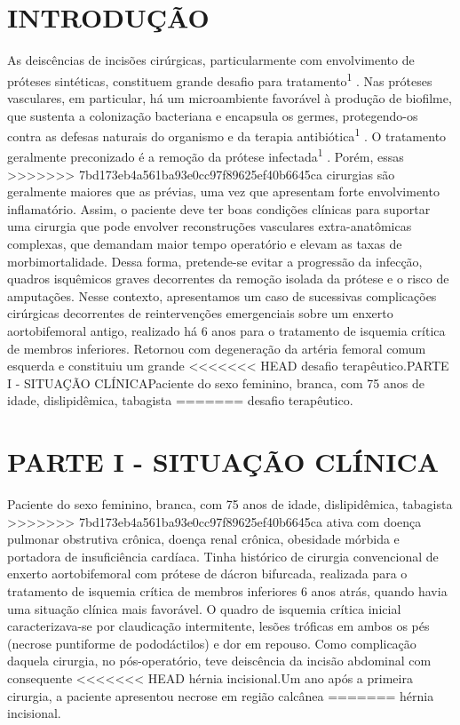 \documentclass[numberinsection,times,10pt,spreadimages]{memoir}
\begin{document}
\section{INTRODUÇÃO}

As deiscências de incisões cirúrgicas, particularmente com envolvimento de
próteses
sintéticas, constituem grande desafio para tratamento\textsuperscript{1}
. Nas próteses vasculares, em particular, há um
microambiente favorável à produção de biofilme, que sustenta a colonização
bacteriana e encapsula os germes, protegendo-os contra as defesas naturais do
organismo e da terapia antibiótica\textsuperscript{1}
. O tratamento geralmente preconizado é a remoção da prótese
infectada\textsuperscript{1}
. Porém, essas
>>>>>>> 7bd173eb4a561ba93e0cc97f89625ef40b6645ca
cirurgias são geralmente maiores que as prévias, uma vez que apresentam forte
envolvimento inflamatório. Assim, o paciente deve ter boas condições clínicas
para
suportar uma cirurgia que pode envolver reconstruções vasculares
extra-anatômicas
complexas, que demandam maior tempo operatório e elevam as taxas de
morbimortalidade. Dessa forma, pretende-se evitar a progressão da infecção,
quadros
isquêmicos graves decorrentes da remoção isolada da prótese e o risco de
amputações.
Nesse contexto, apresentamos um caso de sucessivas complicações cirúrgicas
decorrentes de reintervenções emergenciais sobre um enxerto aortobifemoral
antigo,
realizado há 6 anos para o tratamento de isquemia crítica de membros inferiores.
Retornou com degeneração da artéria femoral comum esquerda e constituiu um
grande
<<<<<<< HEAD
desafio terapêutico.PARTE I - SITUAÇÃO CLÍNICAPaciente do sexo feminino, branca,
com 75 anos de idade, dislipidêmica, tabagista
=======
desafio terapêutico.

\section{PARTE I - SITUAÇÃO CLÍNICA}

Paciente do sexo feminino, branca, com 75 anos de idade, dislipidêmica,
tabagista
>>>>>>> 7bd173eb4a561ba93e0cc97f89625ef40b6645ca
ativa com doença pulmonar obstrutiva crônica, doença renal crônica, obesidade
mórbida e portadora de insuficiência cardíaca. Tinha histórico de cirurgia
convencional de enxerto aortobifemoral com prótese de dácron bifurcada,
realizada
para o tratamento de isquemia crítica de membros inferiores 6 anos atrás, quando
havia uma situação clínica mais favorável. O quadro de isquemia crítica inicial
caracterizava-se por claudicação intermitente, lesões tróficas em ambos os pés
(necrose puntiforme de pododáctilos) e dor em repouso. Como complicação daquela
cirurgia, no pós-operatório, teve deiscência da incisão abdominal com
consequente
<<<<<<< HEAD
hérnia incisional.Um ano após a primeira cirurgia, a paciente apresentou necrose
em região calcânea
=======
hérnia incisional.
\end{document}
